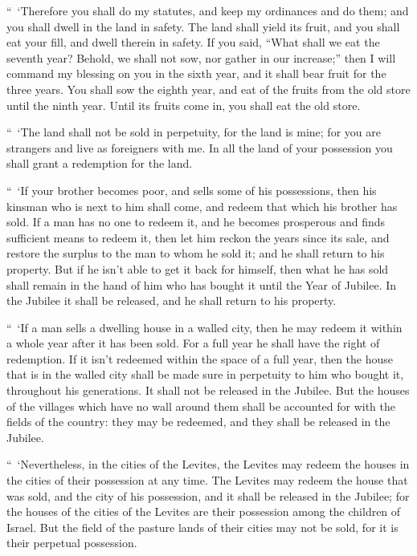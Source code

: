 \myverse{}“ ‘Therefore you shall do my statutes, and keep my ordinances
and do them; and you shall dwell in the land in safety.
\myverse{}The land shall yield its fruit, and you shall eat your fill, and dwell therein
in safety.
\myverse{}If you said, “What shall we eat the seventh year? Behold, we shall not sow,
nor gather in our increase;”
\myverse{}then I will command my blessing on you in the sixth year, and it shall bear
fruit for the three years.
\myverse{}You shall sow the eighth year, and eat of the fruits from the old store until
the ninth year. Until its fruits come in, you shall eat the old store.


\myverse{}“ ‘The land shall not be sold in perpetuity, for the land is
mine; for you are strangers and live as foreigners with me.
\myverse{}In all the land of your possession you shall grant a redemption for the land.


\myverse{}“ ‘If your brother becomes poor, and sells some of his possessions,
then his kinsman who is next to him shall come, and redeem that which his brother has sold.
\myverse{}If a man has no one to redeem it, and he becomes prosperous and finds sufficient
means to redeem it,
\myverse{}then let him reckon the years since its sale, and restore the surplus to
the man to whom he sold it; and he shall return to his property.
\myverse{}But if he isn’t able to get it back for himself, then what he has sold shall
remain in the hand of him who has bought it until the Year of Jubilee. In the Jubilee it shall be released,
and he shall return to his property.


\myverse{}“ ‘If a man sells a dwelling house in a walled city, then he
may redeem it within a whole year after it has been sold. For a full year he shall have the right of redemption.
\myverse{}If it isn’t redeemed within the space of a full year, then the house that
is in the walled city shall be made sure in perpetuity to him who bought it, throughout his generations.
It shall not be released in the Jubilee.
\myverse{}But the houses of the villages which have no wall around them shall be accounted
for with the fields of the country: they may be redeemed, and they shall be released in the Jubilee.


\myverse{}“ ‘Nevertheless, in the cities of the Levites, the Levites may
redeem the houses in the cities of their possession at any time.
\myverse{}The Levites may redeem the house that was sold, and the city of his possession,
and it shall be released in the Jubilee; for the houses of the cities of the Levites are their possession
among the children of Israel.
\myverse{}But the field of the pasture lands of their cities may not be sold, for it
is their perpetual possession.



